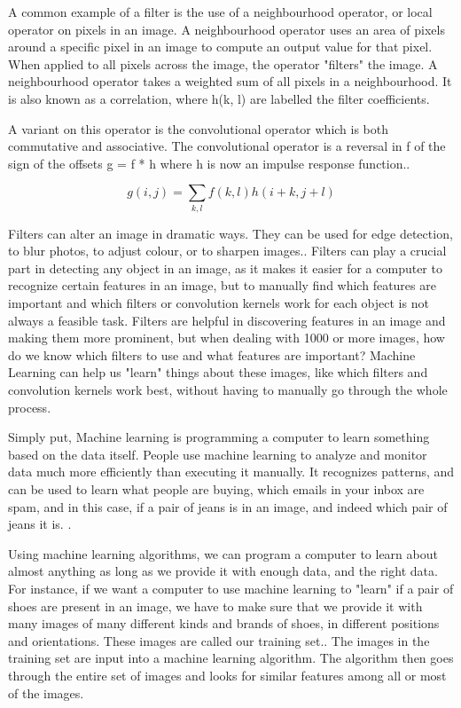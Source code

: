 \documentclass[12pt]{article} %
\begin{document}
A common example of a filter is the use of a neighbourhood operator, or local operator on pixels in an image. A neighbourhood operator uses an area of pixels around a specific pixel in an image to compute an output value for that pixel. When applied to all pixels across the image, the operator "filters" the image. A neighbourhood operator takes a weighted sum of all pixels in a neighbourhood. It is also known as a correlation, where h(k, l) are labelled the filter coefficients. 

A variant on this operator is the convolutional operator which is both commutative and associative. The convolutional operator is a reversal in f of the sign of the offsets g = f * h where h is now an impulse response function.\cite{szeliski2010computer}. 

\[g(i,j) = \sum_{k,l} f(k, l)h(i + k, j + l)\]
	
	Filters can alter an image in dramatic ways. They can be used for edge detection, to blur photos, to adjust colour, or to sharpen images.\cite{szeliski2010computer}. Filters can play a crucial part in detecting any object in an image, as it makes it easier for a computer to recognize certain features in an image, but to manually find which features are important and which filters or convolution kernels work for each object is not always a feasible task. Filters are helpful in discovering features in an image and making them more prominent, but when dealing with 1000 or more images, how do we know which filters to use and what features are important? Machine Learning can help us "learn" things about these images, like which filters and convolution kernels work best, without having to manually go through the whole process. 

Simply put, Machine learning is programming a computer to learn something based on the data itself. People use machine learning to analyze and monitor data much more efficiently than executing it manually. It recognizes patterns, and can be used to learn what people are buying, which emails in your inbox are spam, and in this case, if a pair of jeans is in an image, and indeed which pair of jeans it is. \cite{aurelienMachineLearning}. 

Using machine learning algorithms, we can program a computer to learn about almost anything as long as we provide it with enough data, and the right data. For instance, if we want a computer to use machine learning to "learn" if a pair of shoes are present in an image, we have to make sure that we provide it with many images of many different kinds and brands of shoes, in different positions and orientations. These images are called our training set.\cite{aurelienMachineLearning}. The images in the training set are input into a machine learning algorithm. The algorithm then goes through the entire set of images and looks for similar features among all or most of the images. 
	
\end{document}
